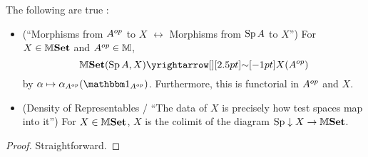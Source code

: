 \documentclass[../main.tex]{subfiles}
\begin{document}
\begin{prop}[Yoneda]
  
  The following are true : 
  \begin{itemize}
    \item (``Morphisms from $A^{op}$ to $X$ $\longleftrightarrow$ 
    Morphisms from $\operatorname{Sp} A$ to $X$'') 
    For $X \in \mathbb{M}\mathbf{Set}$ and $A^{op} \in \mathbb{M}$,
    \[
      \M\SET(\SP A, X) \map{\sim}{} X(A\op)
    \]
    by $\al \mapsto \al_{A\op}(\id{A\op})$.
    Furthermore, this is functorial in $A^{op}$ and $X$.
    \item (Density of Representables 
    / ``The data of $X$ is precisely how test spaces map into it'') 
    For $X \in \mathbb{M}\mathbf{Set}$,
    $X$ is the colimit of the diagram $\operatorname{Sp} \downarrow X \to \mathbb{M}\mathbf{Set}$.
  \end{itemize}
  
\end{prop}
\begin{proof}
  Straightforward.
\end{proof}
\end{document}
